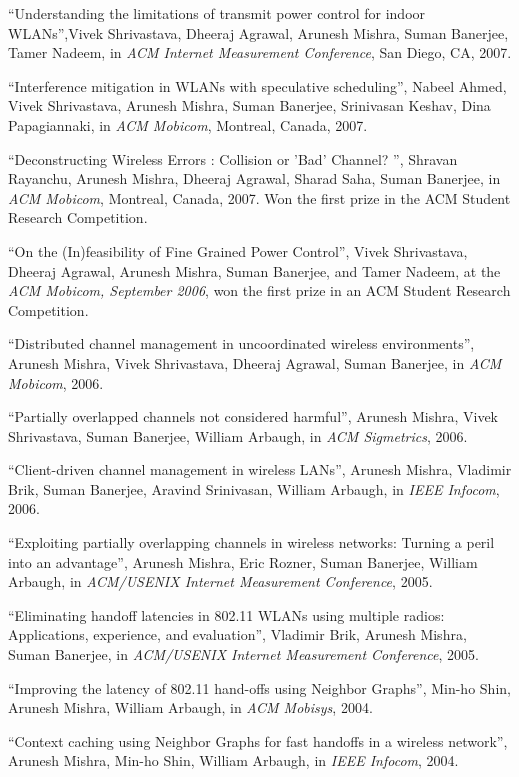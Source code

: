 \begin{resume}
\mybullet ``Understanding the limitations of transmit power control for indoor WLANs'',Vivek Shrivastava, Dheeraj Agrawal, Arunesh Mishra, Suman Banerjee, Tamer Nadeem, in {\it ACM Internet Measurement Conference}, San Diego, CA, 2007.

\mybullet ``Interference mitigation in WLANs with speculative scheduling'', Nabeel Ahmed, Vivek Shrivastava, Arunesh Mishra,
   Suman Banerjee, Srinivasan Keshav, Dina Papagiannaki, in  {\it ACM Mobicom}, Montreal, Canada, 2007.

\mybullet ``Deconstructing Wireless Errors : Collision or 'Bad' Channel? '', Shravan Rayanchu, Arunesh Mishra, Dheeraj Agrawal, Sharad Saha, Suman Banerjee,
in {\it ACM Mobicom}, Montreal, Canada, 2007. Won the first prize in the {ACM Student Research Competition}.

\mybullet ``On the (In)feasibility of Fine Grained Power Control'', Vivek Shrivastava, Dheeraj Agrawal, Arunesh Mishra, Suman Banerjee, and Tamer Nadeem,
at the {\it ACM Mobicom,  September 2006}, won the first prize in an {ACM Student Research Competition}.

\mybullet ``Distributed channel management in uncoordinated wireless environments'', Arunesh Mishra, Vivek Shrivastava,
Dheeraj Agrawal, Suman Banerjee, in {\em ACM Mobicom}, 2006.

\mybullet ``Partially overlapped channels not considered harmful'', Arunesh Mishra, Vivek Shrivastava, Suman Banerjee, William
Arbaugh, in {\em ACM Sigmetrics}, 2006.

\mybullet ``Client-driven channel management in wireless LANs'', Arunesh Mishra, Vladimir Brik, Suman Banerjee, Aravind
Srinivasan, William Arbaugh, in {\em IEEE Infocom}, 2006.

\mybullet ``Exploiting partially overlapping channels in wireless networks: Turning a peril into an advantage'',
Arunesh Mishra, Eric Rozner, Suman Banerjee, William Arbaugh, in  {\em  ACM/USENIX Internet Measurement Conference}, 2005.

\mybullet ``Eliminating handoff latencies in 802.11 WLANs using multiple radios: Applications, experience, and evaluation'', 
Vladimir Brik, Arunesh Mishra, Suman Banerjee, in {\em ACM/USENIX Internet Measurement Conference}, 2005.

\mybullet ``Improving the latency of 802.11 hand-offs using Neighbor Graphs'',
Min-ho Shin, Arunesh Mishra, William Arbaugh, in {\em ACM Mobisys},  2004.

\mybullet ``Context caching using Neighbor Graphs for fast handoffs in a wireless network'', Arunesh Mishra, 
Min-ho Shin, William Arbaugh, in {\em  IEEE Infocom}, 2004.


\end{resume}
